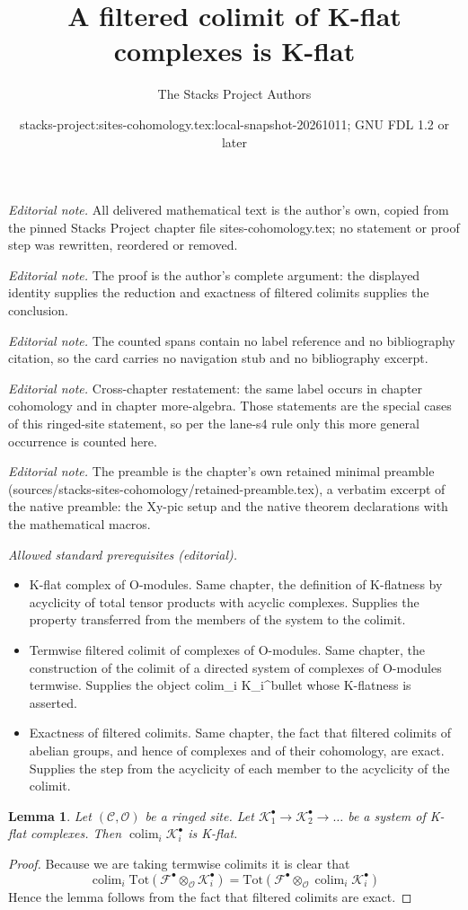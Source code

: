 \documentclass[10pt,a4paper]{amsart}
\title{A filtered colimit of K-flat complexes is K-flat}
\author{The Stacks Project Authors}
\date{stacks-project:sites-cohomology.tex:local-snapshot-20261011; GNU FDL 1.2 or later}
\theoremstyle{plain}
\newtheorem{lemma}[subsection]{Lemma}
\theoremstyle{definition}
\theoremstyle{remark}
\numberwithin{equation}{subsection}
\def\colim{\mathop{\mathrm{colim}}\nolimits}
\begin{document}
\maketitle
\noindent\textit{Editorial note.} All delivered mathematical text is the author's own, copied from the pinned Stacks Project chapter file sites-cohomology.tex; no statement or proof step was rewritten, reordered or removed.\par\medskip
\noindent\textit{Editorial note.} The proof is the author's complete argument: the displayed identity supplies the reduction and exactness of filtered colimits supplies the conclusion.\par\medskip
\noindent\textit{Editorial note.} The counted spans contain no label reference and no bibliography citation, so the card carries no navigation stub and no bibliography excerpt.\par\medskip
\noindent\textit{Editorial note.} Cross-chapter restatement: the same label occurs in chapter cohomology and in chapter more-algebra. Those statements are the special cases of this ringed-site statement, so per the lane-s4 rule only this more general occurrence is counted here.\par\medskip
\noindent\textit{Editorial note.} The preamble is the chapter's own retained minimal preamble (sources/stacks-sites-cohomology/retained-preamble.tex), a verbatim excerpt of the native preamble: the Xy-pic setup and the native theorem declarations with the mathematical macros.\par\medskip
\noindent\textit{Allowed standard prerequisites (editorial).}\begin{itemize}
\item K-flat complex of O-modules. Same chapter, the definition of K-flatness by acyclicity of total tensor products with acyclic complexes. Supplies the property transferred from the members of the system to the colimit.
\item Termwise filtered colimit of complexes of O-modules. Same chapter, the construction of the colimit of a directed system of complexes of O-modules termwise. Supplies the object colim\_i K\_i\textasciicircum{}bullet whose K-flatness is asserted.
\item Exactness of filtered colimits. Same chapter, the fact that filtered colimits of abelian groups, and hence of complexes and of their cohomology, are exact. Supplies the step from the acyclicity of each member to the acyclicity of the colimit.
\end{itemize}\medskip
\begin{lemma}
\label{lemma-colimit-K-flat}
Let $(\mathcal{C}, \mathcal{O})$ be a ringed site.
Let $\mathcal{K}_1^\bullet \to \mathcal{K}_2^\bullet \to \ldots$
be a system of K-flat complexes.
Then $\colim_i \mathcal{K}_i^\bullet$ is K-flat.
\end{lemma}

\begin{proof}
Because we are taking termwise colimits it is clear that
$$
\colim_i \text{Tot}(
\mathcal{F}^\bullet \otimes_\mathcal{O} \mathcal{K}_i^\bullet)
=
\text{Tot}(\mathcal{F}^\bullet \otimes_\mathcal{O}
\colim_i \mathcal{K}_i^\bullet)
$$
Hence the lemma follows from the fact that filtered colimits are
exact.
\end{proof}
\end{document}
